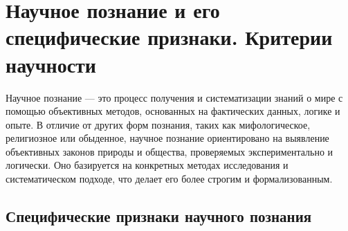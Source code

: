 \documentclass[12pt,a4paper]{article}
\begin{document}
	\section{Научное познание и его специфические признаки. Критерии научности~\checkmark}
	
	Научное познание — это процесс получения и систематизации знаний о мире с помощью объективных методов, основанных на фактических данных, логике и опыте. В отличие от других форм познания, таких как мифологическое, религиозное или обыденное, научное познание ориентировано на выявление объективных законов природы и общества, проверяемых экспериментально и логически. Оно базируется на конкретных методах исследования и систематическом подходе, что делает его более строгим и формализованным.
	
	\subsection{Специфические признаки научного познания}
\end{document}
